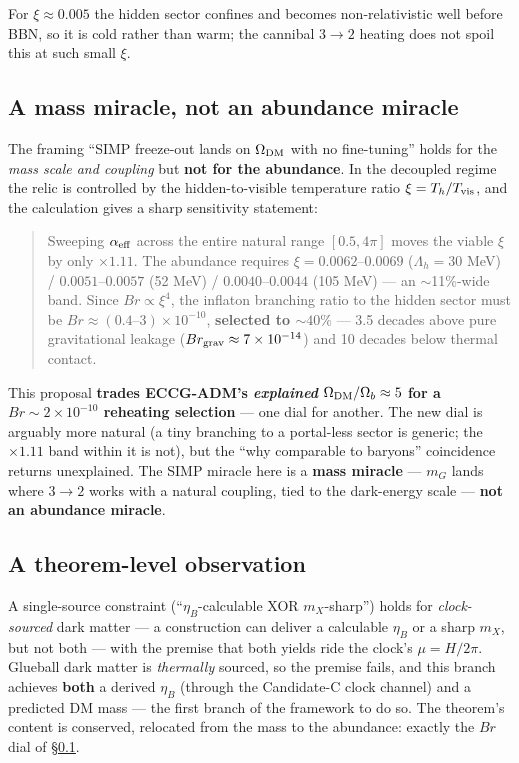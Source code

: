 \documentclass[preprint,12pt]{elsarticle}
\begin{document}
For \(\xi \approx 0.005\) the hidden sector confines and becomes
non-relativistic well before BBN, so it is cold rather than warm; the
cannibal \(3\to2\) heating \citep{Farina:2016llk, Pappadopulo:2016pkp}
does not spoil this at such small \(\xi\).

\subsection{A mass miracle, not an abundance miracle}\label{sec-5-2}

The framing ``SIMP freeze-out lands on \(\Omega_{\rm DM}\) with no
fine-tuning'' holds for the \emph{mass scale and coupling} but
\textbf{not for the abundance}. In the decoupled regime the relic is
controlled by the hidden-to-visible temperature ratio
\(\xi = T_h/T_{\rm vis}\), and the calculation gives a sharp sensitivity
statement:

\begin{quote}
Sweeping \(\alpha_{\rm eff}\) across the entire natural range
\([0.5, 4\pi]\) moves the viable \(\xi\) by only \(\times 1.11\). The
abundance requires \(\xi = 0.0062\)--\(0.0069\) (\(\Lambda_h = 30\) MeV)
/ \(0.0051\)--\(0.0057\) (52 MeV) / \(0.0040\)--\(0.0044\) (105 MeV) ---
an \(\sim\)11\%-wide band. Since \(Br \propto \xi^4\), the inflaton
branching ratio to the hidden sector must be
\(Br \approx (0.4\text{–}3)\times10^{-10}\), \textbf{selected to
\(\sim 40\%\)} --- 3.5 decades above pure gravitational leakage
(\(Br_{\rm grav} \approx 7\times10^{-14}\)) and 10 decades below thermal
contact.
\end{quote}

This proposal \textbf{trades ECCG-ADM's \emph{explained}
\(\Omega_{\rm DM}/\Omega_b \approx 5\) for a \(Br \sim 2\times10^{-10}\)
reheating selection} --- one dial for another. The new dial is arguably
more natural (a tiny branching to a portal-less sector is generic; the
\(\times1.11\) band within it is not), but the ``why comparable to
baryons'' coincidence returns unexplained. The SIMP miracle here is a
\textbf{mass miracle} --- \(m_G\) lands where \(3\to2\) works with a
natural coupling, tied to the dark-energy scale --- \textbf{not an
abundance miracle}.

\subsection{A theorem-level observation}\label{sec-5-3}

A single-source constraint (``\(\eta_B\)-calculable XOR \(m_X\)-sharp'')
holds for \emph{clock-sourced} dark matter --- a construction can
deliver a calculable \(\eta_B\) or a sharp \(m_X\), but not both ---
with the premise that both yields ride the clock's \(\mu = H/2\pi\).
Glueball dark matter is \emph{thermally} sourced, so the premise fails,
and this branch achieves \textbf{both} a derived \(\eta_B\) (through the
Candidate-C clock channel) and a predicted DM mass --- the first branch
of the framework to do so. The theorem's content is conserved, relocated
from the mass to the abundance: exactly the \(Br\) dial of
§\ref{sec-5-2}.
\end{document}
